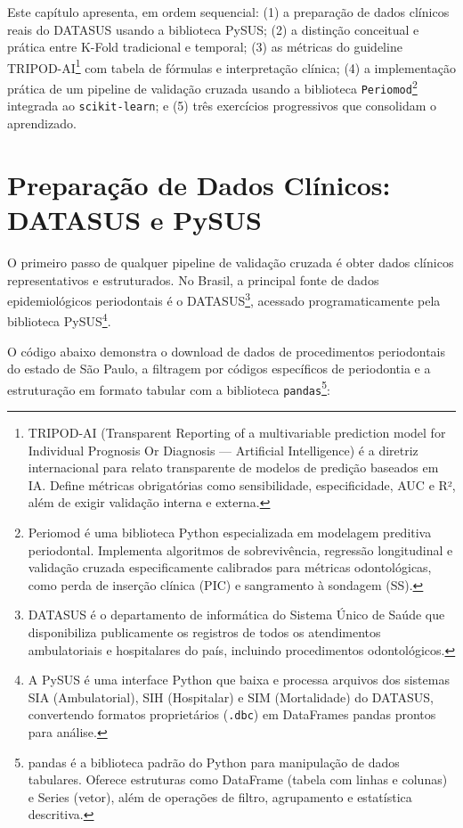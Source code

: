 Este capítulo apresenta, em ordem sequencial: (1) a preparação de
dados clínicos reais do DATASUS usando a biblioteca PySUS; (2) a
distinção conceitual e prática entre K-Fold tradicional e temporal;
(3) as métricas do guideline TRIPOD-AI\footnote{TRIPOD-AI
(Transparent Reporting of a multivariable prediction model for
Individual Prognosis Or Diagnosis — Artificial Intelligence) é a
diretriz internacional para relato transparente de modelos de
predição baseados em IA. Define métricas obrigatórias como
sensibilidade, especificidade, AUC e R², além de exigir validação
interna e externa.} com tabela de fórmulas e interpretação clínica;
(4) a implementação prática de um pipeline de validação cruzada
usando a biblioteca \texttt{Periomod}\footnote{Periomod é uma
biblioteca Python especializada em modelagem preditiva periodontal.
Implementa algoritmos de sobrevivência, regressão longitudinal e
validação cruzada especificamente calibrados para métricas
odontológicas, como perda de inserção clínica (PIC) e sangramento à
sondagem (SS).} integrada ao \texttt{scikit-learn}; e (5) três
exercícios progressivos que consolidam o aprendizado.

\section{Preparação de Dados Clínicos: DATASUS e PySUS}

O primeiro passo de qualquer pipeline de validação cruzada é obter
dados clínicos representativos e estruturados. No Brasil, a principal
fonte de dados epidemiológicos periodontais é o
DATASUS\footnote{DATASUS é o departamento de informática do Sistema
Único de Saúde que disponibiliza publicamente os registros de todos
os atendimentos ambulatoriais e hospitalares do país, incluindo
procedimentos odontológicos.}, acessado programaticamente pela
biblioteca PySUS\footnote{A PySUS é uma interface Python que baixa e
processa arquivos dos sistemas SIA (Ambulatorial), SIH (Hospitalar) e
SIM (Mortalidade) do DATASUS, convertendo formatos proprietários
(\texttt{.dbc}) em DataFrames pandas prontos para análise.}.

O código abaixo demonstra o download de dados de procedimentos
periodontais do estado de São Paulo, a filtragem por códigos
específicos de periodontia e a estruturação em formato tabular com a
biblioteca \texttt{pandas}\footnote{pandas é a biblioteca padrão do
Python para manipulação de dados tabulares. Oferece estruturas como
DataFrame (tabela com linhas e colunas) e Series (vetor), além de
operações de filtro, agrupamento e estatística descritiva.}:

